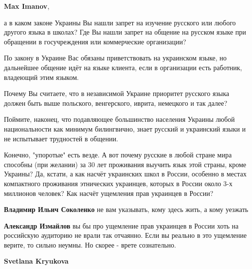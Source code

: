\begin{itemize}
\begin{itemize}
\textbf{Max Imanov}, 

а в каком законе Украины Вы нашли запрет на изучение русского или любого
другого языка в школах? Где Вы нашли запрет на общение на русском языке при
обращении в госучреждения или коммерческие организации? 

По закону в Украине Вас обязаны приветствовать на украинском языке, но
дальнейшее общение идёт на языке клиента, если в организации есть работник,
владеющий этим языком. 

Почему Вы считаете, что в независимой Украине приоритет русского языка должен
быть выше польского, венгерского, иврита, немецкого и так далее? 

Поймите, наконец, что подавляющее большинство населения Украины любой
национальности как минимум билингвично, знает русский и украинский языки и не
испытывает трудностей в общении. 

Конечно, "упоротые" есть везде. А вот почему русские в любой стране мира
способны (при желании) за 30 лет проживания выучить язык этой страны, кроме
Украины? Да, кстати, а как насчёт украинских школ в России, особенно в местах
компактного проживания этнических украинцев, которых в России около 3-х
миллионов человек? Как насчёт ущемления прав украинцев в России?

 
\textbf{Владимир Ильич Соколенко} не вам указывать, кому здесь жить, а кому уезжать

 
\textbf{Александр Измайлов} вы бы про ущемление прав украинцев в России хоть на российскую аудиторию не врали так отчаянно. Если вы реально в это ущемление верите, то сильно неумны. Но скорее - врете сознательно.

 
\textbf{Svetlana Kryukova} 


\end{itemize}
\end{itemize}

